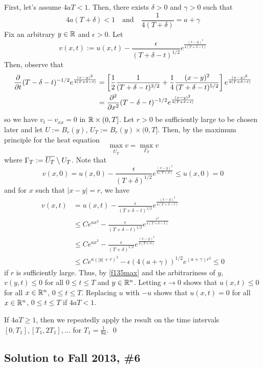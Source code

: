 First, let's assume $4aT < 1$. Then, there exists $\delta > 0$ and $\gamma > 0$ such that
$$ 4a(T+\delta) < 1 \quad \text{and} \quad \frac{1}{4(T+\delta)} = a + \gamma $$
Fix an arbitrary $y \in \mathbb{R}$ and $\epsilon > 0$. Let
$$ v(x,t) := u(x,t) - \frac{\epsilon}{(T+\delta -t)^{1/2}} e^{\frac{(x-y)^2}{4(T+\delta - t)}} $$
Then, observe that
\begin{align*}
\frac{\partial}{\partial t} (T-\delta - t)^{-1/2} e^{\frac{(x-y)^2}{4(T+\delta - t)}} &= \left[ \frac{1}{2} \frac{1}{(T+\delta -t)^{3/2}} + \frac{1}{4} \frac{(x-y)^2}{(T+\delta - t)^{5/2}}\right]  e^{\frac{(x-y)^2}{4(T+\delta - t)}} \\
&= \frac{\partial^2}{\partial x^2} (T-\delta - t)^{-1/2} e^{\frac{(x-y)^2}{4(T+\delta - t)}}
\end{align*}
so we have $v_t - v_{xx} = 0$ in $\mathbb{R} \times (0,T]$. Let $r > 0$ be sufficiently large to be chosen later and let $U := B_r(y)$, $U_T := B_r(y) \times (0,T]$. Then, by the maximum principle for the heat equation
\begin{equation}
\label{f135max}
\max_{\overline{U_T}} v = \max_{\Gamma_T} v
\end{equation}
where $\Gamma_T := \overline{U_T} \setminus U_T$.
Note that
$$ v(x,0) = u(x,0) - \frac{\epsilon}{(T+\delta)^{1/2}} e^{\frac{(x-y)^2}{4(T+\delta)}} \leq u(x,0) = 0 $$
and for $x$ such that $|x-y| = r$, we have
\begin{align*}
v(x,t) &= u(x,t) - \frac{\epsilon}{(T+\delta -t)^{1/2}} e^{\frac{(x-y)^2}{4(T+\delta - t)}} \\
&\leq Ce^{ax^2} - \frac{\epsilon}{(T+\delta -t)^{1/2}} e^{\frac{r^2}{4(T+\delta - t)}} \\
&\leq Ce^{ax^2} - \frac{\epsilon}{(T+\delta)^{1/2}} e^{\frac{(x-y)^2}{4(T+\delta)}} \\
&\leq Ce^{a(|y|+r)^2} - \epsilon (4(a+\gamma))^{1/2} e^{(a+\gamma)r^2} \leq 0
\end{align*}
if $r$ is sufficiently large. Thus, by \eqref{f135max} and the arbitrariness of $y$, $v(y,t) \leq 0$ for all $0 \leq t \leq T$ and $y \in \mathbb{R}^n$. Letting $\epsilon \to 0$ shows that $u(x,t) \leq 0$ for all $x \in \mathbb{R}^n$, $0 \leq t \leq T$. Replacing $u$ with $-u$ shows that $u(x,t) = 0$ for all $x \in \mathbb{R}^n$, $0 \leq t \leq T$ if $4aT < 1$.

If $4aT \geq 1$, then we repeatedly apply the result on the time intervals $[0,T_1], [T_1,2T_1], \dots$ for $T_1 = \frac{1}{8a}$. \hfill \qed



\subsection*{Solution to Fall 2013, \#6}
\label{F13Q6}

